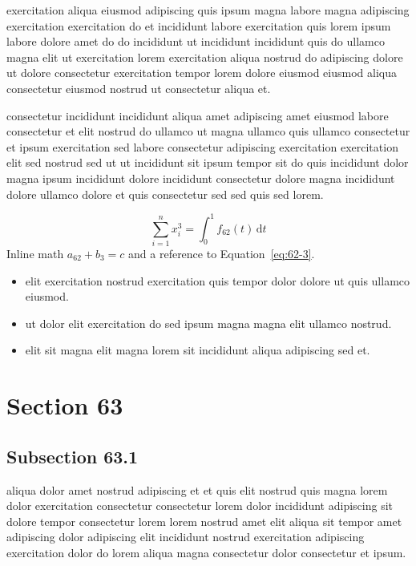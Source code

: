 \documentclass{article}
\begin{document}
exercitation aliqua eiusmod adipiscing quis ipsum magna labore magna adipiscing exercitation exercitation do et incididunt labore exercitation quis lorem ipsum labore dolore amet do do incididunt ut incididunt incididunt quis do ullamco magna elit ut exercitation lorem exercitation aliqua nostrud do adipiscing dolore ut dolore consectetur exercitation tempor lorem dolore eiusmod eiusmod aliqua consectetur eiusmod nostrud ut consectetur aliqua et.

consectetur incididunt incididunt aliqua amet adipiscing amet eiusmod labore consectetur et elit nostrud do ullamco ut magna ullamco quis ullamco consectetur et ipsum exercitation sed labore consectetur adipiscing exercitation exercitation elit sed nostrud sed ut ut incididunt sit ipsum tempor sit do quis incididunt dolor magna ipsum incididunt dolore incididunt consectetur dolore magna incididunt dolore ullamco dolore et quis consectetur sed sed quis sed lorem.

\begin{equation}\label{eq:62-3}
  \sum_{i=1}^{n} x_i^{3} = \int_0^1 f_{62}(t)\,\mathrm{d}t
\end{equation}
Inline math $a_{62} + b_{3} = c$ and a reference to Equation~\eqref{eq:62-3}.

\begin{itemize}
  \item elit exercitation nostrud exercitation quis tempor dolor dolore ut quis ullamco eiusmod.
  \item ut dolor elit exercitation do sed ipsum magna magna elit ullamco nostrud.
  \item elit sit magna elit magna lorem sit incididunt aliqua adipiscing sed et.
\end{itemize}

\section{Section 63}\label{sec:63}
\subsection{Subsection 63.1}\label{sec:63-1}
aliqua dolor amet nostrud adipiscing et et quis elit nostrud quis magna lorem dolor exercitation consectetur consectetur lorem dolor incididunt adipiscing sit dolore tempor consectetur lorem lorem nostrud amet elit aliqua sit tempor amet adipiscing dolor adipiscing elit incididunt nostrud exercitation adipiscing exercitation dolor do lorem aliqua magna consectetur dolor consectetur et ipsum.
\end{document}
